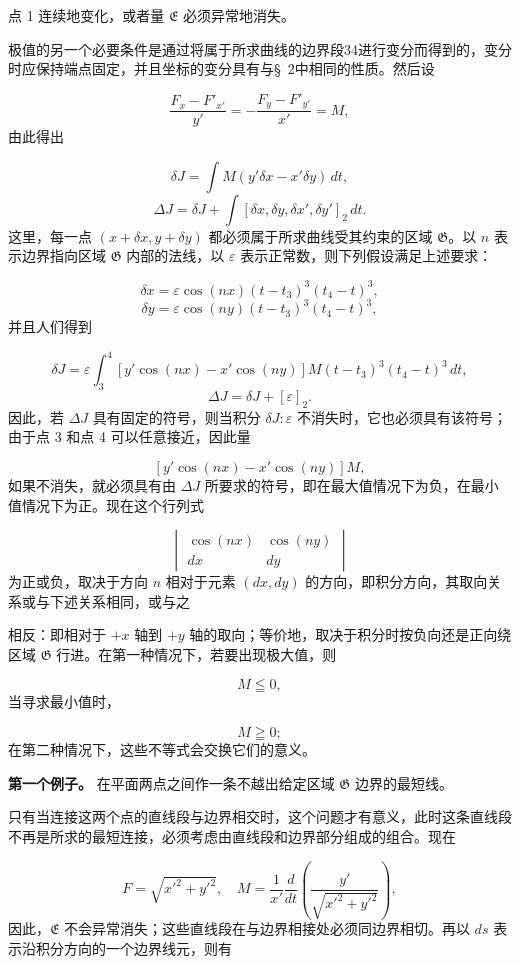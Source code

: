 \documentclass[11pt,a4paper,leqno]{article}
\begin{document}
点 1 连续地变化，或者量 $\mathfrak{E}$ 必须异常地消失。

极值的另一个必要条件是通过将属于所求曲线的边界段34进行变分而得到的，变分时应保持端点固定，并且坐标的变分具有与\S~2中相同的性质。然后设

\[
\frac{F_x-F'_{x'}}{y'}=-\frac{F_y-F'_{y'}}{x'}=M,
\]
由此得出

\[
\delta J=\int M(y'\delta x-x'\delta y)\,dt,
\]
\[
\Delta J=\delta J+\int[\delta x,\delta y,\delta x',\delta y']_2\,dt.
\]
这里，每一点 $(x+\delta x,y+\delta y)$ 都必须属于所求曲线受其约束的区域 $\mathfrak{G}$。以 $n$ 表示边界指向区域 $\mathfrak{G}$ 内部的法线，以 $\varepsilon$ 表示正常数，则下列假设满足上述要求：

\[
\delta x=\varepsilon\cos(nx)(t-t_3)^3(t_4-t)^3,
\]
\[
\delta y=\varepsilon\cos(ny)(t-t_3)^3(t_4-t)^3,
\]
并且人们得到

\[
\delta J=\varepsilon\int_3^4 [y'\cos(nx)-x'\cos(ny)]M(t-t_3)^3(t_4-t)^3\,dt,
\]
\[
\Delta J=\delta J+[\varepsilon]_2.
\]
因此，若 $\Delta J$ 具有固定的符号，则当积分 $\delta J:\varepsilon$ 不消失时，它也必须具有该符号；由于点 3 和点 4 可以任意接近，因此量

\[
[y'\cos(nx)-x'\cos(ny)]M,
\]
如果不消失，就必须具有由 $\Delta J$ 所要求的符号，即在最大值情况下为负，在最小值情况下为正。现在这个行列式

\[
\begin{vmatrix}
\cos(nx)&\cos(ny)\\
dx&dy
\end{vmatrix}
\]
为正或负，取决于方向 $n$ 相对于元素 $(dx,dy)$ 的方向，即积分方向，其取向关系或与下述关系相同，或与之

相反：即相对于 $+x$ 轴到 $+y$ 轴的取向；等价地，取决于积分时按负向还是正向绕区域 $\mathfrak{G}$ 行进。在第一种情况下，若要出现极大值，则

\[
M\leqq 0,
\]
当寻求最小值时，

\[
M\geqq 0;
\]
在第二种情况下，这些不等式会交换它们的意义。

\textbf{第一个例子。} 在平面两点之间作一条不越出给定区域 $\mathfrak{G}$ 边界的最短线。

只有当连接这两个点的直线段与边界相交时，这个问题才有意义，此时这条直线段不再是所求的最短连接，必须考虑由直线段和边界部分组成的组合。现在

\[
F=\sqrt{x'^2+y'^2},\quad
M=\frac{1}{x'}\frac{d}{dt}\left(\frac{y'}{\sqrt{x'^2+y'^2}}\right),
\]
因此，$\mathfrak{E}$ 不会异常消失；这些直线段在与边界相接处必须同边界相切。再以 $ds$ 表示沿积分方向的一个边界线元，则有
\end{document}
